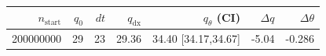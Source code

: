 \begin{tabular}{r r r r r r r}
\hline
$n_{\mathrm{start}}$ & $q_0$ & $dt$ & $q_{\mathrm{dx}}$ & $q_{\theta}$ (CI) & $\Delta q$ & $\Delta\theta$ \\
\hline
200000000 & 29 & 23 & 29.36 & 34.40 [34.17,34.67] & -5.04 & -0.286 \\
\hline
\end{tabular}
